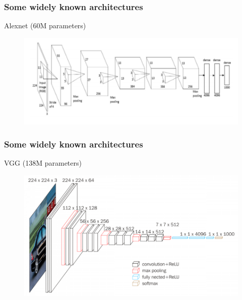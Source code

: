 \documentclass[french,9pt]{beamer}
\begin{document}

\begin{frame}
\frametitle{Some widely known architectures}

Alexnet (60M parameters) \cite{alexnet} 

\begin{figure}
  \begin{center}
    \includegraphics[width=1\textwidth]{fig/alexnet.png}
  \end{center}
\end{figure}


\end{frame}


\begin{frame}
\frametitle{Some widely known architectures}

VGG (138M parameters) \cite{vgg16} 


\begin{figure}
  \begin{center}
    \includegraphics[width=1\textwidth]{fig/vgg_16.png}
  \end{center}
\end{figure}

\end{frame}
\end{document}
